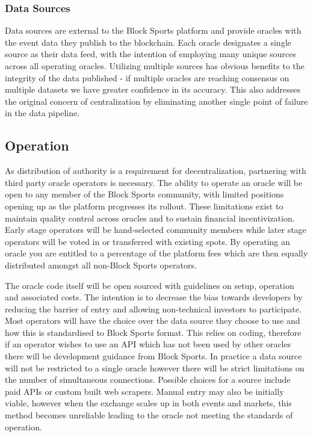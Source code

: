 \documentclass{article}
\begin{document}
		\subsubsection{Data Sources} \label{data-sources}
Data sources are external to the Block Sports platform and provide oracles with the event data they publish to the blockchain. Each oracle designates a single source as their data feed, with the intention of employing many unique sources across all operating oracles. Utilizing multiple sources has obvious benefits to the integrity of the data published - if multiple oracles are reaching consensus on multiple datasets we have greater confidence in its accuracy. This also addresses the original concern of centralization by eliminating another single point of failure in the data pipeline.

	\subsection{Operation} \label{operation}
As distribution of authority is a requirement for decentralization, partnering with third party oracle operators is necessary. The ability to operate an oracle will be open to any member of the Block Sports community, with limited positions opening up as the platform progresses its rollout. These limitations exist to maintain quality control across oracles and to sustain financial incentivization. Early stage operators will be hand-selected community members while later stage operators will be voted in or transferred with existing spots. By operating an oracle you are entitled to a percentage of the platform fees which are then equally distributed amongst all non-Block Sports operators.

The oracle code itself will be open sourced with guidelines on setup, operation and associated costs. The intention is to decrease the bias towards developers by reducing the barrier of entry and allowing non-technical investors to participate. Most operators will have the choice over the data source they choose to use and how this is standardised to Block Sports format. This relies on coding, therefore if an operator wishes to use an API which has not been used by other oracles there will be development guidance from Block Sports. In practice a data source will not be restricted to a single oracle however there will be strict limitations on the number of simultaneous connections. Possible choices for a source include paid APIs or custom built web scrapers. Manual entry may also be initially viable, however when the exchange scales up in both events and markets, this method becomes unreliable leading to the oracle not meeting the standards of operation.
\end{document}
